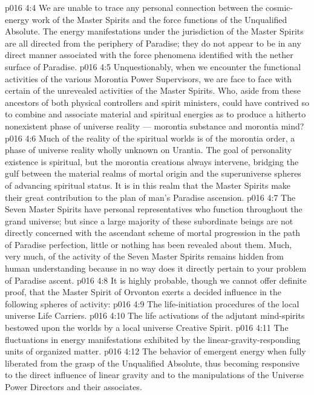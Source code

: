 \vs p016 4:4 We are unable to trace any personal connection between the cosmic\hyp{}energy work of the Master Spirits and the force functions of the Unqualified Absolute. The energy manifestations under the jurisdiction of the Master Spirits are all directed from the periphery of Paradise; they do not appear to be in any direct manner associated with the force phenomena identified with the nether surface of Paradise.
\vs p016 4:5 Unquestionably, when we encounter the functional activities of the various Morontia Power Supervisors, we are face to face with certain of the unrevealed activities of the Master Spirits. Who, aside from these ancestors of both physical controllers and spirit ministers, could have contrived so to combine and associate material and spiritual energies as to produce a hitherto nonexistent phase of universe reality --- morontia substance and morontia mind?
\vs p016 4:6 Much of the reality of the spiritual worlds is of the morontia order, a phase of universe reality wholly unknown on Urantia. The goal of personality existence is spiritual, but the morontia creations always intervene, bridging the gulf between the material realms of mortal origin and the superuniverse spheres of advancing spiritual status. It is in this realm that the Master Spirits make their great contribution to the plan of man’s Paradise ascension.
\vs p016 4:7 The Seven Master Spirits have personal representatives who function throughout the grand universe; but since a large majority of these subordinate beings are not directly concerned with the ascendant scheme of mortal progression in the path of Paradise perfection, little or nothing has been revealed about them. Much, very much, of the activity of the Seven Master Spirits remains hidden from human understanding because in no way does it directly pertain to your problem of Paradise ascent.
\vs p016 4:8 \pc It is highly probable, though we cannot offer definite proof, that the Master Spirit of Orvonton exerts a decided influence in the following spheres of activity:
\vs p016 4:9 \bibnobreakspace The life\hyp{}initiation procedures of the local universe Life Carriers.
\vs p016 4:10 \bibnobreakspace The life activations of the adjutant mind\hyp{}spirits bestowed upon the worlds by a local universe Creative Spirit.
\vs p016 4:11 \bibnobreakspace The fluctuations in energy manifestations exhibited by the linear\hyp{}gravity\hyp{}responding units of organized matter.
\vs p016 4:12 \bibnobreakspace The behavior of emergent energy when fully liberated from the grasp of the Unqualified Absolute, thus becoming responsive to the direct influence of linear gravity and to the manipulations of the Universe Power Directors and their associates.
